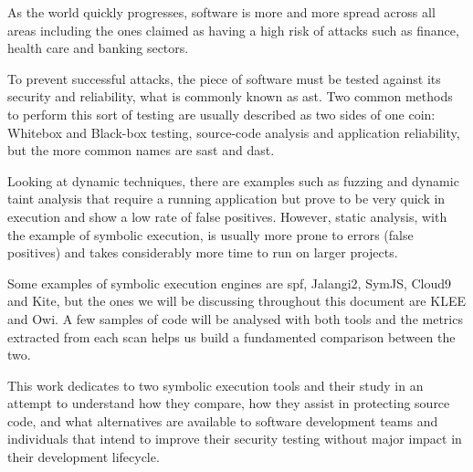 
\makeatletter
\newcommand{\@keywords}{Symbolic Execution, Application Security Testing, Static Code Analysis, KLEE, Owi}
\makeatother

As the world quickly progresses, software is more and more spread across all areas including the ones claimed as having a high risk of attacks such as finance, health care and banking sectors. 

To prevent successful attacks, the piece of software must be tested against its security and reliability, what is commonly known as \acrfull{ast}. Two common methods to perform this sort of testing are usually described as two sides of one coin: White\discretionary{-}{-}{-}box and Black-box testing, source-code analysis and application reliability, but the more common names are \acrfull{sast} and \acrfull{dast}.

Looking at dynamic techniques, there are examples such as fuzzing and dynamic taint analysis that require a running application but prove to be very quick in execution and show a low rate of false positives. However, static analysis, with the example of symbolic execution, is usually more prone to errors (false positives) and takes considerably more time to run on larger projects.

Some examples of symbolic execution engines are \acrfull{spf}, Jalangi2, SymJS, Cloud9 and Kite, but the ones we will be discussing throughout this document are KLEE and Owi. A few samples of code will be analysed with both tools and the metrics extracted from each scan helps us build a fundamented comparison between the two.

This work dedicates to two symbolic execution tools and their study in an attempt to understand how they compare, how they assist in protecting source code, and what alternatives are available to software development teams and individuals that intend to improve their security testing without major impact in their development lifecycle.